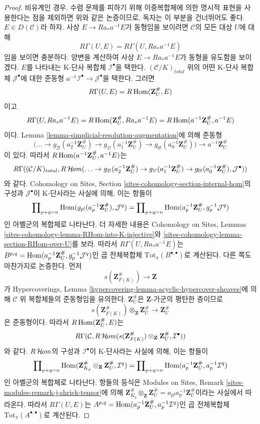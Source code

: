 \begin{proof}
\medskip\noindent
비유계인 경우. 수렴 문제를 피하기 위해 이중복합체에 의한 명시적
표현을 사용한다는 점을 제외하면 위와 같은 논증이므로, 독자는 이
부분을 건너뛰어도 좋다. $E \in D(\mathcal{C})$라 하자.
사상 $E \to Ra_*a^{-1}E$가 동형임을 보이려면
$\mathcal{C}$의 모든 대상 $U$에 대해
$$
R\Gamma(U, E) = R\Gamma(U, Ra_*a^{-1}E)
$$
임을 보이면 충분하다. 양변을 계산하여 사상
$E \to Ra_*a^{-1}E$가 동형을 유도함을 보이겠다.
$E$를 나타내는 K-단사 복합체 $\mathcal{I}^\bullet$을 택한다.
$(\mathcal{C}/K)_{total}$ 위의 어떤 K-단사 복합체
$\mathcal{J}^\bullet$에 대한 준동형
$a^{-1}\mathcal{I}^\bullet \to \mathcal{J}^\bullet$을 택한다. 그러면
$$
R\Gamma(U, E) = R\mathop{\mathrm{Hom}}\nolimits(\mathbf{Z}_U^\#, E)
$$
이고
$$
R\Gamma(U, Ra_*a^{-1}E) = R\mathop{\mathrm{Hom}}\nolimits(\mathbf{Z}_U^\#, Ra_*a^{-1}E) =
R\mathop{\mathrm{Hom}}\nolimits(a^{-1}\mathbf{Z}_U^\#, a^{-1}E)
$$
이다. Lemma \ref{lemma-simplicial-resolution-augmentation}에 의해 준동형
$$
\Big(\ldots \to
g_{2!}(a_2^{-1}\mathbf{Z}_U^\#) \to
g_{1!}(a_1^{-1}\mathbf{Z}_U^\#) \to
g_{0!}(a_0^{-1}\mathbf{Z}_U^\#)\Big)
\longrightarrow
a^{-1}\mathbf{Z}_U^\#
$$
이 있다. 따라서 $R\mathop{\mathrm{Hom}}\nolimits(a^{-1}\mathbf{Z}_U^\#, a^{-1}E)$는
$$
R\Gamma((\mathcal{C}/K)_{total},
R\mathop{\mathcal{H}\!\mathit{om}}\nolimits(
\ldots \to
g_{2!}(a_2^{-1}\mathbf{Z}_U^\#) \to
g_{1!}(a_1^{-1}\mathbf{Z}_U^\#) \to
g_{0!}(a_0^{-1}\mathbf{Z}_U^\#),
\mathcal{J}^\bullet))
$$
와 같다. Cohomology on Sites, Section
\ref{sites-cohomology-section-internal-hom}의 구성과
$\mathcal{J}^\bullet$이 K-단사라는 사실에 의해, 이는 항들이
$$
\prod\nolimits_{p + q = n}
\mathop{\mathrm{Hom}}\nolimits(g_{p!}(a_p^{-1}\mathbf{Z}_U^\#), \mathcal{J}^q) =
\prod\nolimits_{p + q = n}
\mathop{\mathrm{Hom}}\nolimits(a_p^{-1}\mathbf{Z}_U^\#, g_p^{-1}\mathcal{J}^q)
$$
인 아벨군의 복합체로 나타난다. 더 자세한 내용은 Cohomology on Sites,
Lemmas \ref{sites-cohomology-lemma-RHom-into-K-injective}와
\ref{sites-cohomology-lemma-section-RHom-over-U}를 보라.
따라서 $R\Gamma(U, Ra_*a^{-1}E)$는\newline
$B^{p, q} = \mathop{\mathrm{Hom}}\nolimits(a_p^{-1}\mathbf{Z}_U^\#, g_p^{-1}\mathcal{J}^q)$인
곱 전체복합체 $\text{Tot}_\pi(B^{\bullet, \bullet})$로 계산된다.
다른 쪽도 마찬가지로 논증한다. 먼저
$$
s(\mathbf{Z}_{F(K)}^\#) \longrightarrow \mathbf{Z}
$$
가 Hypercoverings, Lemma
\ref{hypercovering-lemma-acyclic-hypercover-sheaves}에 의해
$\mathcal{C}$ 위 복합체들의 준동형임을 유의한다.
$\mathbf{Z}_U^\#$은 $\mathbf{Z}$-가군의 평탄한 층이므로
$$
s(\mathbf{Z}_{F(K)}^\#) \otimes_\mathbf{Z} \mathbf{Z}_U^\#
\longrightarrow
\mathbf{Z}_U^\#
$$
은 준동형이다. 따라서 $R\mathop{\mathrm{Hom}}\nolimits(\mathbf{Z}_U^\#, E)$는
$$
R\Gamma(\mathcal{C}, R\mathop{\mathcal{H}\!\mathit{om}}\nolimits(
s(\mathbf{Z}_{F(K)}^\#) \otimes_\mathbf{Z} \mathbf{Z}_U^\#,
\mathcal{I}^\bullet))
$$
와 같다. $R\mathop{\mathcal{H}\!\mathit{om}}\nolimits$의 구성과 $\mathcal{I}^\bullet$이
K-단사라는 사실에 의해, 이는 항들이
$$
\prod\nolimits_{p + q = n}
\mathop{\mathrm{Hom}}\nolimits(\mathbf{Z}^\#_{K_p} \otimes_\mathbf{Z} \mathbf{Z}_U^\#, \mathcal{I}^q)
=
\prod\nolimits_{p + q = n}
\mathop{\mathrm{Hom}}\nolimits(a_p^{-1}\mathbf{Z}_U^\#, a_p^{-1}\mathcal{I}^q)
$$
인 아벨군의 복합체로 나타난다. 항들의 등식은 Modules on Sites,
Remark \ref{sites-modules-remark-j-shriek-tensor}에 의해
$\mathbf{Z}^\#_{K_p} \otimes_\mathbf{Z} \mathbf{Z}_U^\# =
a_{p!}a_p^{-1}\mathbf{Z}_U^\#$이라는 사실에서 따라온다.
따라서 $R\Gamma(U, E)$는
$A^{p, q} = \mathop{\mathrm{Hom}}\nolimits(a_p^{-1}\mathbf{Z}_U^\#, a_p^{-1}\mathcal{I}^q)$인
곱 전체복합체 $\text{Tot}_\pi(A^{\bullet, \bullet})$로 계산된다.


\end{proof}
